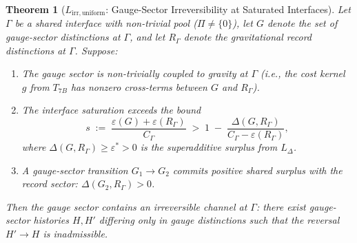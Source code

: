 \documentclass[11pt]{article}
\newtheorem{theorem}{Theorem}[section]
\theoremstyle{definition}
\begin{document}
\begin{theorem}[$L_{\mathrm{irr,uniform}}$: Gauge-Sector Irreversibility at Saturated Interfaces]\label{thm:Lirr_uniform}
Let $\Gamma$ be a shared interface with non-trivial pool ($\Pi \ne \{0\}$),
let $G$ denote the set of gauge-sector distinctions at $\Gamma$, and let
$R_\Gamma$ denote the gravitational record distinctions at $\Gamma$.
Suppose:
\begin{enumerate}[label=(\alph*),nosep]
  \item The gauge sector is non-trivially coupled to gravity at $\Gamma$
  (i.e., the cost kernel $g$ from $T_{7B}$ has nonzero cross-terms
  between $G$ and $R_\Gamma$).
  \item The interface saturation exceeds the bound
  \begin{equation}
    s \;:=\; \frac{\varepsilon(G) + \varepsilon(R_\Gamma)}{C_\Gamma}
    \;>\; 1 \;-\; \frac{\Delta(G, R_\Gamma)}{C_\Gamma - \varepsilon(R_\Gamma)},
    \label{eq:saturation_bound}
  \end{equation}
  where $\Delta(G, R_\Gamma) \ge \varepsilon^* > 0$ is the superadditive
  surplus from $L_\Delta$.
  \item A gauge-sector transition $G_1 \to G_2$ commits positive shared
  surplus with the record sector: $\Delta(G_2, R_\Gamma) > 0$.
\end{enumerate}
Then the gauge sector contains an irreversible channel at $\Gamma$:
there exist gauge-sector histories $H, H'$ differing only in gauge
distinctions such that the reversal $H' \to H$ is inadmissible.
\end{theorem}
\end{document}
